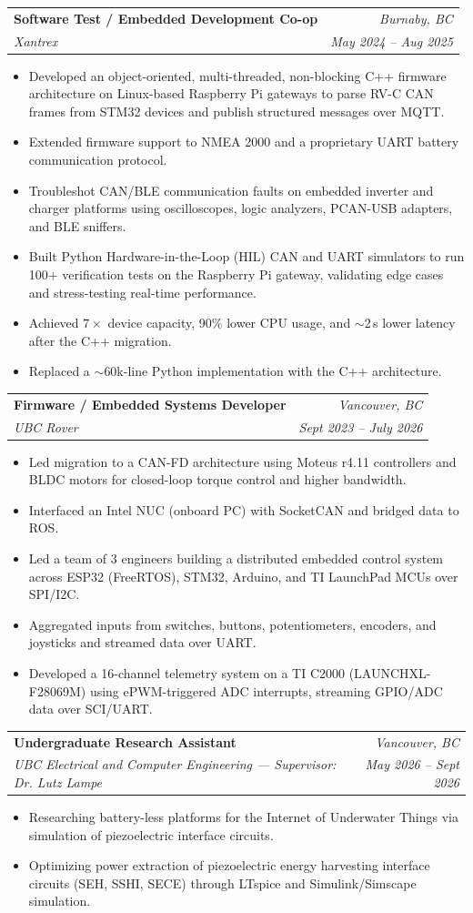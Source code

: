 \documentclass[letterpaper,11pt]{article}
\makeatletter
\newcommand{\resumeItem}[1]{
  \item\small{
    {#1 \vspace{-2pt}}
  }
}
\newcommand{\resumeSubheading}[4]{
  \vspace{-2pt}\item
    \begin{tabular*}{0.97\textwidth}[t]{l@{\extracolsep{\fill}}r}
      \textbf{#1} & \textit{\small #4} \\
      \textit{\small#3} & \textit{\small #2} \\
    \end{tabular*}\vspace{-7pt}
}
\newcommand{\resumeItemListStart}{\begin{itemize}[leftmargin=0.2in]}
\newcommand{\resumeItemListEnd}{\end{itemize}\vspace{-5pt}}
\makeatother
\begin{document}
\resumeSubheading
      {Software Test / Embedded Development Co-op}{May 2024 -- Aug 2025}
      {Xantrex}{Burnaby, BC}
      \resumeItemListStart
        \resumeItem{Developed an object-oriented, multi-threaded, non-blocking C++ firmware architecture on Linux-based Raspberry Pi gateways to parse RV-C CAN frames from STM32 devices and publish structured messages over MQTT.}
        \resumeItem{Extended firmware support to NMEA 2000 and a proprietary UART battery communication protocol.}
        \resumeItem{Troubleshot CAN/BLE communication faults on embedded inverter and charger platforms using oscilloscopes, logic analyzers, PCAN-USB adapters, and BLE sniffers.}
        \resumeItem{Built Python Hardware-in-the-Loop (HIL) CAN and UART simulators to run 100+ verification tests on the Raspberry Pi gateway, validating edge cases and stress-testing real-time performance.}
        \resumeItem{Achieved $7\times$ device capacity, 90\% lower CPU usage, and $\sim$2\,s lower latency after the C++ migration.}
        \resumeItem{Replaced a $\sim$60k-line Python implementation with the C++ architecture.}
      \resumeItemListEnd

    \resumeSubheading
      {Firmware / Embedded Systems Developer}{Sept 2023 -- July 2026}
      {UBC Rover}{Vancouver, BC}
      \resumeItemListStart
        \resumeItem{Led migration to a CAN-FD architecture using Moteus r4.11 controllers and BLDC motors for closed-loop torque control and higher bandwidth.}
        \resumeItem{Interfaced an Intel NUC (onboard PC) with SocketCAN and bridged data to ROS.}
        \resumeItem{Led a team of 3 engineers building a distributed embedded control system across ESP32 (FreeRTOS), STM32, Arduino, and TI LaunchPad MCUs over SPI/I2C.}
        \resumeItem{Aggregated inputs from switches, buttons, potentiometers, encoders, and joysticks and streamed data over UART.}
        \resumeItem{Developed a 16-channel telemetry system on a TI C2000 (LAUNCHXL-F28069M) using ePWM-triggered ADC interrupts, streaming GPIO/ADC data over SCI/UART.}
      \resumeItemListEnd

    \resumeSubheading
      {Undergraduate Research Assistant}{May 2026 -- Sept 2026}
      {UBC Electrical and Computer Engineering --- Supervisor: Dr. Lutz Lampe}{Vancouver, BC}
      \resumeItemListStart
        \resumeItem{Researching battery-less platforms for the Internet of Underwater Things via simulation of piezoelectric interface circuits.}
        \resumeItem{Optimizing power extraction of piezoelectric energy harvesting interface circuits (SEH, SSHI, SECE) through LTspice and Simulink/Simscape simulation.}
      \resumeItemListEnd
\end{document}
